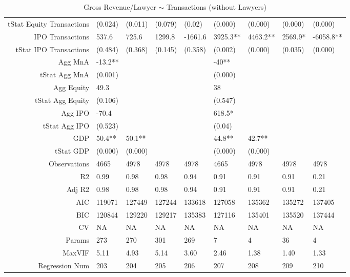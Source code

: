 \begin{table}[ht]
\begin{tabular}{rllllllll}
  tStat Equity Transactions & (0.024) & (0.011) & (0.079) & (0.02) & (0.000) & (0.000) & (0.000) & (0.000) \\ 
  IPO Transactions & 537.6 & 725.6 & 1299.8 & -1661.6 & 3925.3** & 4463.2** & 2569.9* & -6058.8** \\ 
  tStat IPO Transactions & (0.484) & (0.368) & (0.145) & (0.358) & (0.002) & (0.000) & (0.035) & (0.000) \\ 
  Agg MnA & -13.2** &  &  &  & -40** &  &  &  \\ 
  tStat Agg MnA & (0.001) &  &  &  & (0.000) &  &  &  \\ 
  Agg Equity & 49.3 &  &  &  & 38 &  &  &  \\ 
  tStat Agg Equity & (0.106) &  &  &  & (0.547) &  &  &  \\ 
  Agg IPO & -70.4 &  &  &  & 618.5* &  &  &  \\ 
  tStat Agg IPO & (0.523) &  &  &  & (0.04) &  &  &  \\ 
  GDP & 50.4** & 50.1** &  &  & 44.8** & 42.7** &  &  \\ 
  tStat GDP & (0.000) & (0.000) &  &  & (0.000) & (0.000) &  &  \\ 
  Observations & 4665 & 4978 & 4978 & 4978 & 4665 & 4978 & 4978 & 4978 \\ 
  R2 & 0.99 & 0.98 & 0.98 & 0.94 & 0.91 & 0.91 & 0.91 & 0.21 \\ 
  Adj R2 & 0.98 & 0.98 & 0.98 & 0.94 & 0.91 & 0.91 & 0.91 & 0.21 \\ 
  AIC & 119071 & 127449 & 127244 & 133618 & 127058 & 135362 & 135272 & 137405 \\ 
  BIC & 120844 & 129220 & 129217 & 135383 & 127116 & 135401 & 135520 & 137444 \\ 
  CV & NA & NA & NA & NA & NA & NA & NA & NA \\ 
  Params & 273 & 270 & 301 & 269 & 7 & 4 & 36 & 4 \\ 
  MaxVIF & 5.11 & 4.93 & 5.14 & 3.60 & 2.46 & 1.38 & 1.40 & 1.33 \\ 
  Regression Num & 203 & 204 & 205 & 206 & 207 & 208 & 209 & 210 \\ 
   \hline
\end{tabular}
\caption{Gross Revenue/Lawyer $\sim$ Transactions (without Lawyers)} 
\end{table}
